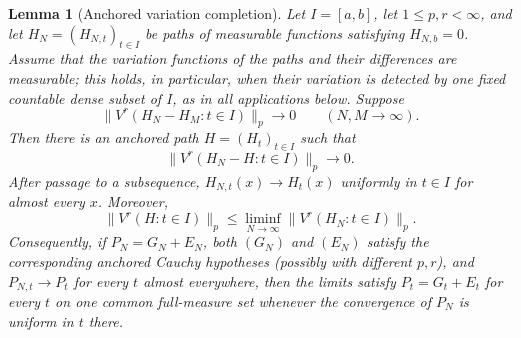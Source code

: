 \documentclass[11pt]{article}
\numberwithin{equation}{section}
\newtheorem{lemma}[theorem]{Lemma}
\theoremstyle{remark}
\theoremstyle{definition}
\newcommand{\norm}[1]{\lVert #1\rVert}
\begin{document}
\begin{lemma}[Anchored variation completion]\label{lem:anchored-variation-completion}
Let $I=[a,b]$, let $1\le p,r<\infty$, and let
$H_N=(H_{N,t})_{t\in I}$ be paths of measurable functions satisfying
$H_{N,b}=0$.  Assume that the variation functions of the paths and their
differences are measurable; this holds, in particular, when their
variation is detected by one fixed countable dense subset of $I$, as in
all applications below.  Suppose
\begin{equation}\label{eq:anchored-variation-cauchy}
 \norm{V^r(H_N-H_M:t\in I)}_p\longrightarrow0
 \qquad(N,M\to\infty).
\end{equation}
Then there is an anchored path $H=(H_t)_{t\in I}$ such that
\begin{equation}\label{eq:anchored-variation-limit}
 \norm{V^r(H_N-H:t\in I)}_p\longrightarrow0.
\end{equation}
After passage to a subsequence, $H_{N,t}(x)\to H_t(x)$ uniformly in
$t\in I$ for almost every $x$.  Moreover,
\begin{equation}\label{eq:anchored-variation-fatou}
 \norm{V^r(H:t\in I)}_p
 \le\liminf_{N\to\infty}\norm{V^r(H_N:t\in I)}_p.
\end{equation}
Consequently, if $P_N=G_N+E_N$, both $(G_N)$ and $(E_N)$ satisfy the
corresponding anchored Cauchy hypotheses (possibly with different
$p,r$), and $P_{N,t}\to P_t$ for every $t$ almost everywhere, then the
limits satisfy $P_t=G_t+E_t$ for every $t$ on one common full-measure
set whenever the convergence of $P_N$ is uniform in $t$ there.
\end{lemma}
\end{document}
